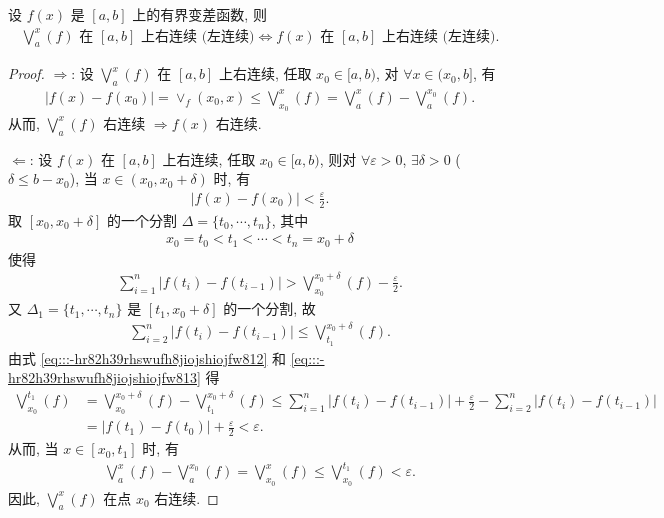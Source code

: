 \documentclass[../../main.tex]{subfiles}%
\begin{document}
\begin{theorem}
设 $f(x)$ 是 $[a,b]$ 上的有界变差函数, 则
\begin{align*}
\bigvee_a^x(f) \text{ 在 } [a,b] \text{ 上右连续 (左连续)} \iff f(x) \text{ 在 } [a,b] \text{ 上右连续 (左连续)}.
\end{align*}
\end{theorem}
\begin{proof}

$\Longrightarrow$: 设 $\bigvee_a^x(f)$ 在 $[a,b]$ 上右连续, 任取 $x_0\in[a,b)$, 对 $\forall x\in(x_0,b]$, 有
\begin{align*}
|f(x)-f(x_0)| = \vee_f(x_0,x) \leqslant \bigvee_{x_0}^x(f) = \bigvee_a^x(f) - \bigvee_a^{x_0}(f).
\end{align*}
从而, $\bigvee_a^x(f)$ 右连续 $\Rightarrow f(x)$ 右连续.

$\Longleftarrow$: 设 $f(x)$ 在 $[a,b]$ 上右连续, 任取 $x_0\in[a,b)$, 则对 $\forall\varepsilon>0$, $\exists\delta>0$ ($\delta\leqslant b-x_0$), 当 $x\in(x_0,x_0+\delta)$ 时, 有
\begin{align*}
|f(x)-f(x_0)| < \frac{\varepsilon}{2}.
\end{align*}
取 $[x_0,x_0+\delta]$ 的一个分割 $\Delta = \{t_0,\cdots,t_n\}$, 其中
\begin{align*}
x_0 = t_0 < t_1 < \cdots < t_n = x_0+\delta
\end{align*}
使得
\begin{align}
\sum_{i=1}^n |f(t_i)-f(t_{i-1})| > \bigvee_{x_0}^{x_0+\delta}(f) - \frac{\varepsilon}{2}. \label{eq:::-hr82h39rhswufh8jiojshiojfw812}
\end{align}
又 $\Delta_1 = \{t_1,\cdots,t_n\}$ 是 $[t_1,x_0+\delta]$ 的一个分割, 故
\begin{align}
\sum_{i=2}^n |f(t_i)-f(t_{i-1})| \leqslant \bigvee_{t_1}^{x_0+\delta}(f). \label{eq:::-hr82h39rhswufh8jiojshiojfw813}
\end{align}
由式 \eqref{eq:::-hr82h39rhswufh8jiojshiojfw812} 和 \eqref{eq:::-hr82h39rhswufh8jiojshiojfw813} 得
\begin{align*}
\bigvee_{x_0}^{t_1}(f) &= \bigvee_{x_0}^{x_0+\delta}(f) - \bigvee_{t_1}^{x_0+\delta}(f) 
\leqslant \sum_{i=1}^n |f(t_i)-f(t_{i-1})| + \frac{\varepsilon}{2} - \sum_{i=2}^n |f(t_i)-f(t_{i-1})| \\
&= |f(t_1)-f(t_0)| + \frac{\varepsilon}{2} < \varepsilon.
\end{align*}
从而, 当 $x\in[x_0,t_1]$ 时, 有
\begin{align*}
\bigvee_a^x(f) - \bigvee_a^{x_0}(f) = \bigvee_{x_0}^x(f) \leqslant \bigvee_{x_0}^{t_1}(f) < \varepsilon.
\end{align*}
因此, $\bigvee_a^x(f)$ 在点 $x_0$ 右连续.
\end{proof}
\end{document}
